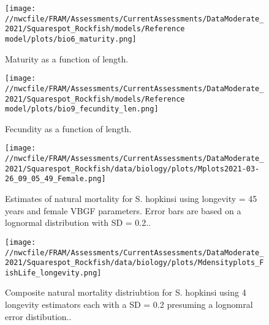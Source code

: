 \documentclass[11pt,
  english,
  a4paper,
]{article}
\begin{document}
\tagmcend\tagstructend


\begin{figure}
\centering
\texttt{[image: //nwcfile/FRAM/Assessments/CurrentAssessments/DataModerate\_2021/Squarespot\_Rockfish/models/Reference model/plots/bio6\_maturity.png]}
\caption{Maturity as a function of length.\label{fig:maturity}}
\end{figure}

\tagmcend\tagstructend


\begin{figure}
\centering
\texttt{[image: //nwcfile/FRAM/Assessments/CurrentAssessments/DataModerate\_2021/Squarespot\_Rockfish/models/Reference model/plots/bio9\_fecundity\_len.png]}
\caption{Fecundity as a function of length.\label{fig:fecundity}}
\end{figure}

\tagmcend\tagstructend


\begin{figure}
\centering
\texttt{[image: //nwcfile/FRAM/Assessments/CurrentAssessments/DataModerate\_2021/Squarespot\_Rockfish/data/biology/plots/Mplots2021-03-26\_09\_05\_49\_Female.png]}
\caption{Estimates of natural mortality for S. hopkinsi using longevity = 45 years and female VBGF parameters. Error bars are based on a lognormal distribution with SD = 0.2..\label{fig:M_female}}
\end{figure}

\tagmcend\tagstructend


\begin{figure}
\centering
\texttt{[image: //nwcfile/FRAM/Assessments/CurrentAssessments/DataModerate\_2021/Squarespot\_Rockfish/data/biology/plots/Mdensityplots\_FishLife\_longevity.png]}
\caption{Composite natural mortality distriubtion for S. hopkinsi using 4 longevity estimators each with a SD = 0.2 presuming a lognomral error distibution..\label{fig:M_composite_dists}}
\end{figure}
\end{document}
